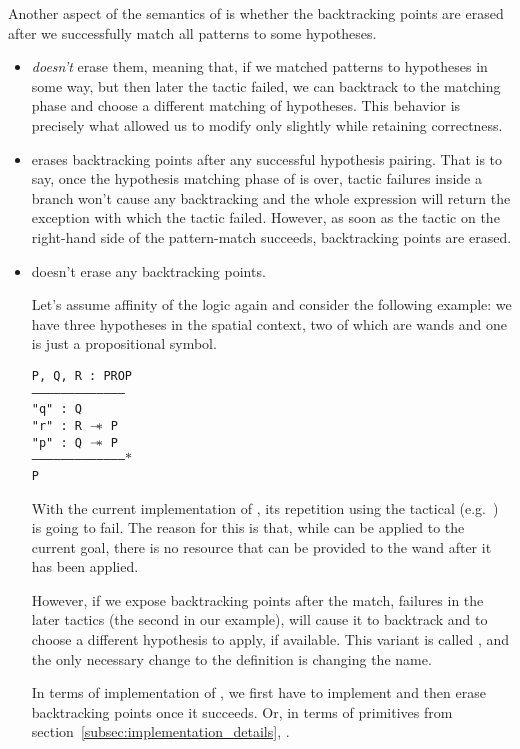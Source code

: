 Another aspect of the semantics of  is whether the backtracking points are erased after we successfully match all patterns to some hypotheses.
\begin{itemize}
\item {} \emph{doesn't} erase them, meaning that, if we matched patterns to hypotheses in some way, but then later the tactic failed, we can backtrack to the matching phase and choose a different matching of hypotheses.
This behavior is precisely what allowed us to modify  only slightly while retaining correctness.
\item {} erases backtracking points after any successful hypothesis pairing.
 That is to say, once the hypothesis matching phase of  is over, tactic failures inside a branch won't cause any backtracking and the whole expression will return the exception with which the tactic failed.
  However, as soon as the tactic on the right-hand side of the pattern-match succeeds, backtracking points are erased.
\item {} doesn't erase any backtracking points.

  Let's assume affinity of the logic again and consider the following example:
  we have three hypotheses in the spatial context, two of which are wands and one is just a propositional symbol.

\begin{minipage}{1.0\linewidth}
\texttt{P, Q, R : PROP\\
---------------------------------------\\
"q" : Q\\
"r" : R $\mathrel{-\mkern-6mu*}$ P\\
"p" : Q $\mathrel{-\mkern-6mu*}$ P\\
--------------------------------------$\ast$\\
P}
\end{minipage}

With the current implementation of , its repetition using the  tactical (e.g.\ ) is going to fail.
The reason for this is that, while  can be applied to the current goal, there is no resource that can be provided to the wand after it has been applied.

However, if we expose backtracking points after the match, failures in the later tactics (the second  in our example), will cause it to backtrack and
to choose a different hypothesis to apply, if available.
This variant is called , and the only necessary change to the  definition is changing the name.

In terms of implementation of , we first have to implement  and then erase backtracking points once it succeeds.
Or, in terms of primitives from section~\ref{subsec:implementation_details}, .
\end{itemize}

